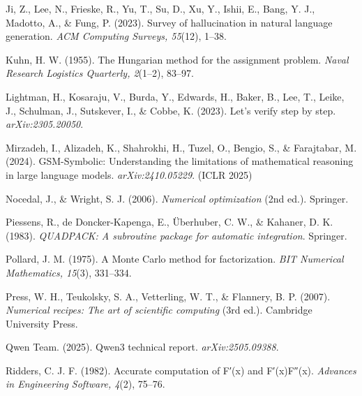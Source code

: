 \documentclass[12pt]{article}
\begin{document}
{\raggedright\hangindent=0.95cm Ji, Z., Lee, N., Frieske, R., Yu, T., Su, D., Xu, Y., Ishii, E., Bang, Y. J., Madotto, A., \& Fung, P. (2023). Survey of hallucination in natural language generation. \textit{ACM Computing Surveys, 55}(12), 1–38.\par}

{\raggedright\hangindent=0.95cm Kuhn, H. W. (1955). The Hungarian method for the assignment problem. \textit{Naval Research Logistics Quarterly, 2}(1–2), 83–97.\par}

{\raggedright\hangindent=0.95cm Lightman, H., Kosaraju, V., Burda, Y., Edwards, H., Baker, B., Lee, T., Leike, J., Schulman, J., Sutskever, I., \& Cobbe, K. (2023). Let’s verify step by step. \textit{arXiv:2305.20050}.\par}

{\raggedright\hangindent=0.95cm Mirzadeh, I., Alizadeh, K., Shahrokhi, H., Tuzel, O., Bengio, S., \& Farajtabar, M. (2024). GSM-Symbolic: Understanding the limitations of mathematical reasoning in large language models. \textit{arXiv:2410.05229}. (ICLR 2025)\par}

{\raggedright\hangindent=0.95cm Nocedal, J., \& Wright, S. J. (2006). \textit{Numerical optimization} (2nd ed.). Springer.\par}

{\raggedright\hangindent=0.95cm Piessens, R., de Doncker-Kapenga, E., Überhuber, C. W., \& Kahaner, D. K. (1983). \textit{QUADPACK: A subroutine package for automatic integration}. Springer.\par}

{\raggedright\hangindent=0.95cm Pollard, J. M. (1975). A Monte Carlo method for factorization. \textit{BIT Numerical Mathematics, 15}(3), 331–334.\par}

{\raggedright\hangindent=0.95cm Press, W. H., Teukolsky, S. A., Vetterling, W. T., \& Flannery, B. P. (2007). \textit{Numerical recipes: The art of scientific computing} (3rd ed.). Cambridge University Press.\par}

{\raggedright\hangindent=0.95cm Qwen Team. (2025). Qwen3 technical report. \textit{arXiv:2505.09388}.\par}

{\raggedright\hangindent=0.95cm Ridders, C. J. F. (1982). Accurate computation of F′(x) and F′(x)F″(x). \textit{Advances in Engineering Software, 4}(2), 75–76.\par}
\end{document}
